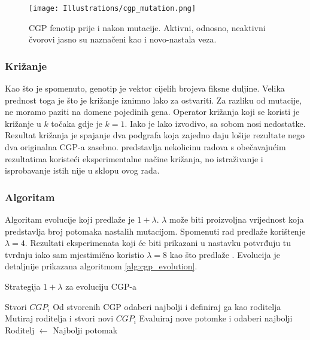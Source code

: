 \begin{figure}
	\centering
	\texttt{[image: Illustrations/cgp\_mutation.png]}
	\caption{CGP fenotip prije i nakon mutacije. Aktivni, odnosno, neaktivni čvorovi jasno su naznačeni kao i novo-nastala veza.}
	\label{fig:cgp_mutation}
\end{figure}

\subsubsection{Križanje}
Kao što je spomenuto, genotip je vektor cijelih brojeva fiksne duljine.
Velika prednost toga je što je križanje iznimno lako za ostvariti.
Za razliku od mutacije, ne moramo paziti na domene pojedinih gena.
Operator križanja koji se koristi je križanje u $k$ točaka gdje je $k = 1$.
Iako je lako izvodivo, sa sobom nosi nedostatke.
Rezultat križanja je spajanje dva podgrafa koja zajedno daju lošije rezultate nego dva originalna CGP-a zasebno.
\cite{cgp_experiment} predstavlja nekolicinu radova s obečavajućim rezultatima koristeći eksperimentalne načine križanja, no istraživanje i isprobavanje istih nije u sklopu ovog rada.

\subsubsection{Algoritam}
Algoritam evolucije koji predlaže \cite{cgp} je $1 + \lambda$.
$\lambda$ može biti proizvoljna vrijednost koja predstavlja broj potomaka nastalih mutacijom.
Spomenuti rad predlaže korištenje $\lambda = 4$.
Rezultati eksperimenata koji će biti prikazani u nastavku potvrđuju tu tvrdnju iako sam mjestimično koristio $\lambda = 8$ kao što predlaže \cite{Sekanina2011}.
Evolucija je detaljnije prikazana algoritmom \ref{alg:cgp_evolution}.

\begin{algorithm}
	\caption{Strategija $1 + \lambda$ za evoluciju CGP-a}
	\label{alg:cgp_evolution}
	\begin{algorithmic}
			\STATE Stvori $CGP_i$
		\ENDFOR
		\STATE Od stvorenih CGP odaberi najbolji i definiraj ga kao roditelja
				\STATE Mutiraj roditelja i stvori novi $CGP_i$
			\ENDFOR
			\STATE Evaluiraj nove potomke i odaberi najbolji
				\STATE Roditelj $\leftarrow$ Najbolji potomak
			\ENDIF
		\ENDWHILE
	\end{algorithmic}
\end{algorithm}

